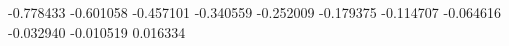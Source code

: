 -0.778433
-0.601058
-0.457101
-0.340559
-0.252009
-0.179375
-0.114707
-0.064616
-0.032940
-0.010519
0.016334
